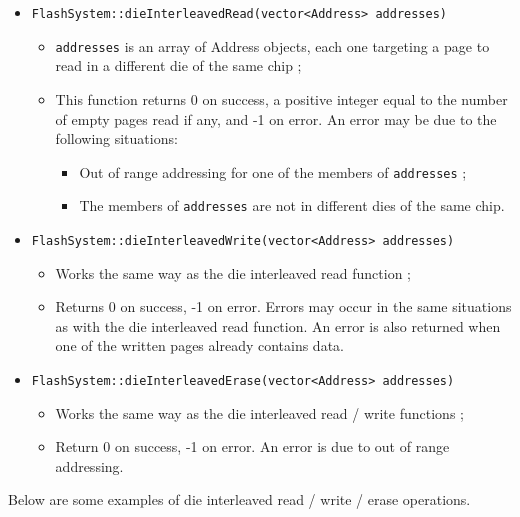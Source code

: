\begin{itemize}
  \item \verb+FlashSystem::dieInterleavedRead(vector<Address> addresses)+
  \begin{itemize}
    \item \verb+addresses+ is an array of Address objects, each one targeting a page to read in a different die of the same chip ;
    \item This function returns 0 on success, a positive integer equal to the number of empty pages read if any, and -1 on error. An error may be due to the following situations:
    \begin{itemize}
      \item Out of range addressing for one of the members of \verb+addresses+ ;
      \item The members of \verb+addresses+ are not in different dies of the same chip.
    \end{itemize}
  \end{itemize}
  
  \item \verb+FlashSystem::dieInterleavedWrite(vector<Address> addresses)+
  \begin{itemize}
    \item Works the same way as the die interleaved read function ;
    \item Returns 0 on success, -1 on error. Errors may occur in the same situations as with the die interleaved read function. An error is also returned when one of the written pages already contains data.
  \end{itemize}
  
  \item \verb+FlashSystem::dieInterleavedErase(vector<Address> addresses)+
  \begin{itemize}
    \item Works the same way as the die interleaved read / write functions ;
    \item Return 0 on success, -1 on error. An error is due to out of range addressing.
  \end{itemize}
\end{itemize}

Below are some examples of die interleaved read / write / erase operations.

